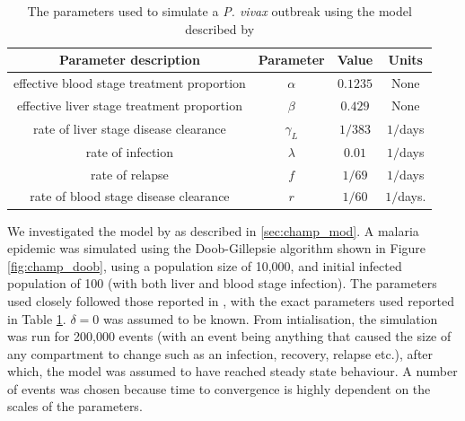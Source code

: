 \begin{table}[htbp]
    \caption{
        The parameters used to simulate a \textit{P. vivax} outbreak using
        the model described by \cite{champagne_using_2022}
    }
    \label{tab:synth_params}
    \centering
    \begin{tabular}{c | c | c | c}
        Parameter description                      & Parameter
                                                   & Value      & Units     \\
        \hline
        effective blood stage treatment proportion & $\alpha$
                                                   & $0.1235$      & None      \\
        effective liver stage treatment proportion & $\beta $
                                                   & $0.429$      & None      \\
        rate of liver stage disease clearance      & $\gamma_L$
                                                   & $1 / 383$  & $1/$days  \\
        rate of infection                          & $\lambda$
                                                   & $0.01$     & $1/$days  \\
        rate of relapse                            & $f$
                                                   & $1/69$     & $1/$days  \\
        rate of blood stage disease clearance      & $r$
                                                   & $1/60$     & $1/$days. \\
    \end{tabular}
\end{table}

We investigated the model by \cite{champagne_using_2022} as described in
\ref{sec:champ_mod}. A malaria epidemic was simulated using the Doob-Gillepsie
algorithm shown in Figure \ref{fig:champ_doob}, using a population
size of 10,000, and initial infected population of 100 (with both liver and blood
stage infection). The parameters used closely followed those reported in
\cite{champagne_using_2022}, with the exact parameters used reported in Table
\ref{tab:synth_params}. $\delta = 0$ was assumed to be known.
From intialisation, the simulation was run for 200,000 events
(with an event being anything that caused the size of any compartment to change
such as an infection, recovery, relapse etc.), after which, the model was
assumed to have reached steady state behaviour. A number of events was chosen
because time to convergence is highly dependent on the scales of the parameters.

